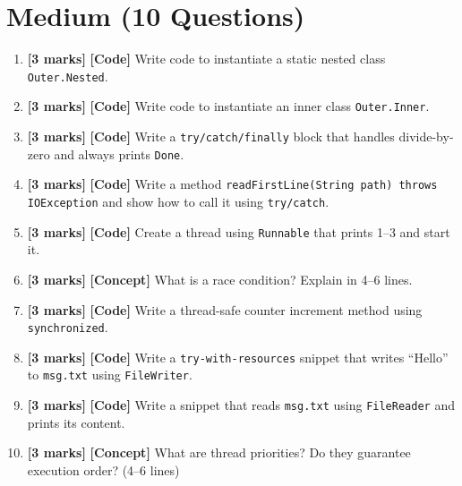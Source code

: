 \documentclass[11pt,a4paper]{article}
\newcommand{\MMarks}{\textbf{[3 marks]} }
\begin{document}
\section*{Medium (10 Questions)}
\begin{enumerate}[label=\textbf{M\arabic*.}, leftmargin=*]
  \item \MMarks \textbf{[Code]} Write code to instantiate a static nested class \texttt{Outer.Nested}.

  \item \MMarks \textbf{[Code]} Write code to instantiate an inner class \texttt{Outer.Inner}.

  \item \MMarks \textbf{[Code]} Write a \texttt{try/catch/finally} block that handles divide-by-zero and always prints \texttt{Done}.

  \item \MMarks \textbf{[Code]} Write a method \texttt{readFirstLine(String path) throws IOException} and show how to call it using \texttt{try/catch}.

  \item \MMarks \textbf{[Code]} Create a thread using \texttt{Runnable} that prints 1--3 and start it.

  \item \MMarks \textbf{[Concept]} What is a race condition? Explain in 4--6 lines.

  \item \MMarks \textbf{[Code]} Write a thread-safe counter increment method using \texttt{synchronized}.

  \item \MMarks \textbf{[Code]} Write a \texttt{try-with-resources} snippet that writes ``Hello'' to \texttt{msg.txt} using \texttt{FileWriter}.

  \item \MMarks \textbf{[Code]} Write a snippet that reads \texttt{msg.txt} using \texttt{FileReader} and prints its content.

  \item \MMarks \textbf{[Concept]} What are thread priorities? Do they guarantee execution order? (4--6 lines)
\end{enumerate}
\end{document}
